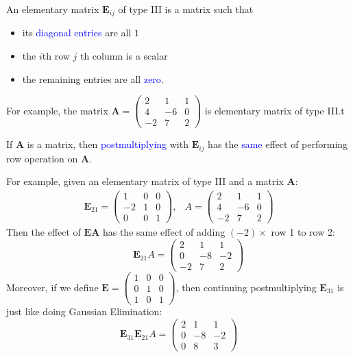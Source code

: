\begin{definition}
An elementary matrix $\bm{E}_{ij}$ of type III is a matrix such that 
\begin{itemize}
\item
its \textcolor{blue}{diagonal entries} are all $1$
\item
the $i$th row $j$ th column is a scalar
\item
the remaining entries are all \textcolor{blue}{zero}.
\end{itemize}
\end{definition}
For example, the matrix $\bm A = \begin{pmatrix}
2 & 1 & 1 \\ 4 & -6 & 0 \\ -2 & 7 & 2
\end{pmatrix}$ is elementary matrix of type III.t

\begin{remark}
If $\bm A$ is a matrix, then \textcolor{blue}{postmultiplying} with $\bm E_{ij}$ has the \textcolor{blue}{same} effect of performing row operation on $\bm A$. 

For example, given an elementary matrix of type III and a matrix $\bm A$:
\[
\begin{array}{ll}
\bm E_{21} = \begin{pmatrix}
1 & 0 & 0 \\ -2 & 1 & 0 \\ 0 & 0 & 1
\end{pmatrix}, &A = \begin{pmatrix}
2 & 1 & 1 \\ 4 & -6 & 0 \\ -2 & 7 & 2
\end{pmatrix}
\end{array}\]
Then the effect of $\bm E \bm A$ has the same effect of adding $(-2)\times$ row 1 to row 2:
\[\qquad \bm E_{21}A = \begin{pmatrix}
2 & 1 & 1 \\ 0 & -8 & -2 \\ -2 & 7 & 2
\end{pmatrix}\]
Moreover, if we define $\bm E = \begin{pmatrix}
1 & 0 & 0 \\ 0 & 1 & 0 \\ 1 & 0 & 1
\end{pmatrix}$, then continuing postmultiplying $\bm E_{31}$ is just like doing Gaussian Elimination:
\[
\bm E_{31}\bm E_{21} A = 
\begin{pmatrix}
2 & 1 & 1 \\ 0 & -8 & -2 \\ 0 & 8 & 3
\end{pmatrix}
\]
\end{remark}